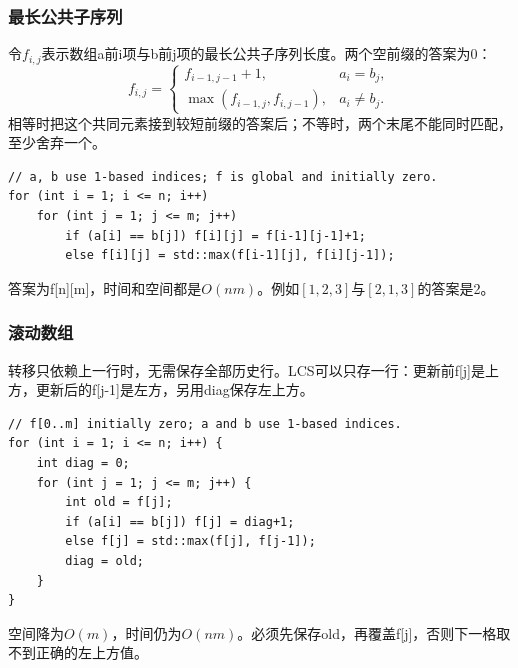 \subsubsection{最长公共子序列}
令$f_{i,j}$表示数组a前i项与b前j项的最长公共子序列长度。两个空前缀的答案为0：
\[
f_{i,j}=
\begin{cases}
f_{i-1,j-1}+1,&a_i=b_j,\\
\max(f_{i-1,j},f_{i,j-1}),&a_i\ne b_j.
\end{cases}
\]
相等时把这个共同元素接到较短前缀的答案后；不等时，两个末尾不能同时匹配，至少舍弃一个。
\begin{lstlisting}
// a, b use 1-based indices; f is global and initially zero.
for (int i = 1; i <= n; i++)
    for (int j = 1; j <= m; j++)
        if (a[i] == b[j]) f[i][j] = f[i-1][j-1]+1;
        else f[i][j] = std::max(f[i-1][j], f[i][j-1]);
\end{lstlisting}
答案为f[n][m]，时间和空间都是$O(nm)$。例如$[1,2,3]$与$[2,1,3]$的答案是2。
\subsubsection{滚动数组}
转移只依赖上一行时，无需保存全部历史行。LCS可以只存一行：更新前f[j]是上方，更新后的f[j-1]是左方，另用diag保存左上方。
\begin{lstlisting}
// f[0..m] initially zero; a and b use 1-based indices.
for (int i = 1; i <= n; i++) {
    int diag = 0;
    for (int j = 1; j <= m; j++) {
        int old = f[j];
        if (a[i] == b[j]) f[j] = diag+1;
        else f[j] = std::max(f[j], f[j-1]);
        diag = old;
    }
}
\end{lstlisting}
空间降为$O(m)$，时间仍为$O(nm)$。必须先保存old，再覆盖f[j]，否则下一格取不到正确的左上方值。
